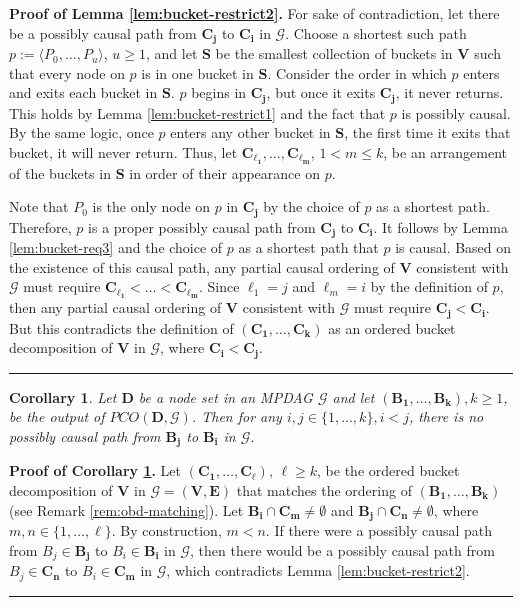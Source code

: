 \documentclass[11pt]{article}
\newcommand{\BlackBox}{\rule{1.5ex}{1.5ex}}  %
\newtheorem{corollary}[theorem]{Corollary}
\newcommand{\mb}[1]{\mathbf{#1}}
\newcommand{\g}[1][G]{\mathcal{#1}}
\newenvironment{proofof}[1][]{\noindent \textbf{Proof of #1.}}{\hfill\BlackBox}
\begin{document}
\begin{proofof}[Lemma \ref{lem:bucket-restrict2}]
    For sake of contradiction, let there be a possibly causal path from $\mb{C_j}$ to $\mb{C_i}$ in $\g$. Choose a shortest such path $p :=\langle P_0, \dots, P_u \rangle$, $u \ge 1$, and let $\mb{S}$ be the smallest collection of buckets in $\mb{V}$ such that every node on $p$ is in one bucket in $\mb{S}$. Consider the order in which $p$ enters and exits each bucket in $\mb{S}$. $p$ begins in $\mb{C_j}$, but once it exits $\mb{C_j}$, it never returns. This holds by Lemma \ref{lem:bucket-restrict1} and the fact that $p$ is possibly causal. By the same logic, once $p$ enters any other bucket in $\mb{S}$, the first time it exits that bucket, it will never return. Thus, let $\mb{C_{\ell_1}}, \dots, \mb{C_{\ell_m}}$, $1 < m \le k$, be an arrangement of the buckets in $\mb{S}$ in order of their appearance on $p$.
    
    Note that $P_0$ is the only node on $p$ in $\mb{C_j}$ by the choice of $p$ as a shortest path. Therefore, $p$ is a proper possibly causal path from $\mb{C_j}$ to $\mb{C_i}$. It follows by Lemma \ref{lem:bucket-req3} and the choice of $p$ as a shortest path that $p$ is causal. Based on the existence of this causal path, any partial causal ordering of $\mb{V}$ consistent with $\g$ must require $\mb{C_{\ell_1}} < \dots < \mb{C_{\ell_m}}$. Since $\ell_1 = j$ and $\ell_m = i$ by the definition of $p$, then any partial causal ordering of $\mb{V}$ consistent with $\g$ must require $\mb{C_j} < \mb{C_i}$. But this contradicts the definition of $(\mb{C_1}, \dots, \mb{C_k})$ as an ordered bucket decomposition of $\mb{V}$ in $\g$, where $\mb{C_i} < \mb{C_j}$.
\end{proofof}


\begin{corollary} 
\label{cor:bucket-restrict2a}
    Let $\mb{D}$ be a node set in an MPDAG $\g$ and let $(\mb{B_1}, \dots, \mb{B_k}), k \ge 1$, be the output of $PCO(\mb{D}, \g)$. Then for any $i, j \in \{1, \dots, k\}, i < j$, there is no possibly causal path from $\mb{B_j}$ to $\mb{B_i}$ in $\g$.
\end{corollary}

\begin{proofof}[Corollary \ref{cor:bucket-restrict2a}]
    Let $(\mb{C_1}, \dots, \mb{C_{\ell}})$, $\ell \ge k$, be the ordered bucket decomposition of $\mb{V}$ in $\g=(\mb{V},\mb{E})$ that matches the ordering of $(\mb{B_1}, \dots, \mb{B_k})$ (see Remark \ref{rem:obd-matching}). Let $\mb{B_i} \cap \mb{C_m} \neq \emptyset$ and $\mb{B_j} \cap \mb{C_n} \neq \emptyset$, where $m,n \in \{1, \dots, \ell\}$. By construction, $m<n$. If there were a possibly causal path from $B_j \in \mb{B_j}$ to $B_i \in \mb{B_i}$ in $\g$, then there would be a possibly causal path from $B_j \in \mb{C_n}$ to $B_i \in \mb{C_m}$ in $\g$, which contradicts Lemma \ref{lem:bucket-restrict2}.
\end{proofof}
\end{document}
